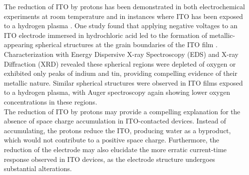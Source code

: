 \noindent The reduction of ITO by protons has been demonstrated in both electrochemical experiments at room temperature \cite{wang2003optical} and in instances where ITO has been exposed to a hydrogen plasma \cite{banerjee1987degradation}. One study found that applying negative voltages to an ITO electrode immersed in hydrochloric acid led to the formation of metallic-appearing spherical structures at the grain boundaries of the ITO film \cite{huang2003electrochemical}. Characterization with Energy Dispersive X-ray Spectroscopy (EDS) \cite{huang2003electrochemical} and X-ray Diffraction (XRD) \cite{liu2015important} revealed these spherical regions were depleted of oxygen or exhibited only peaks of indium and tin, providing compelling evidence of their metallic nature. Similar spherical structures were observed in ITO films exposed to a hydrogen plasma, with Auger spectroscopy again showing lower oxygen concentrations in these regions.\\


\noindent The reduction of ITO by protons may provide a compelling explanation for the absence of space charge accumulation in ITO-contacted devices. Instead of accumulating, the protons reduce the ITO, producing water as a byproduct, which would not contribute to a positive space charge. Furthermore, the reduction of the electrode may also elucidate the more erratic current-time response observed in ITO devices, as the electrode structure undergoes substantial alterations.\\



